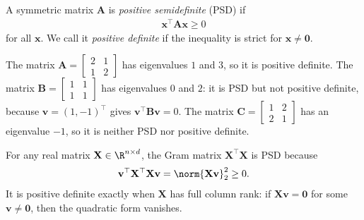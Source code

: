 \documentclass[a4paper, 12pt]{book}
\begin{document}
\begin{definition}
    A symmetric matrix $\mathbf{A}$ is \emph{positive semidefinite} (PSD) if
    \begin{align}
        \mathbf{x}^\top \mathbf{A}\mathbf{x} \geq 0
    \end{align}
    for all $\mathbf{x}$. We call it \emph{positive definite} if the inequality is strict for $\mathbf{x} \neq \mathbf{0}$.
\end{definition}

\begin{example}
    The matrix
    $\mathbf{A} = \begin{bmatrix}2&1\\1&2\end{bmatrix}$
    has eigenvalues $1$ and $3$, so it is positive definite. The matrix
    $\mathbf{B} = \begin{bmatrix}1&1\\1&1\end{bmatrix}$
    has eigenvalues $0$ and $2$: it is PSD but not positive definite, because
    $\mathbf{v}=(1,-1)^\top$ gives $\mathbf{v}^\top\mathbf{B}\mathbf{v}=0$. The matrix
    $\mathbf{C} = \begin{bmatrix}1&2\\2&1\end{bmatrix}$ has an eigenvalue $-1$, so it
    is neither PSD nor positive definite.
\end{example}

\begin{example}
    For any real matrix $\mathbf{X} \in \R^{n \times d}$, the Gram matrix
    $\mathbf{X}^\top\mathbf{X}$ is PSD because
    \begin{align}
        \mathbf{v}^\top \mathbf{X}^\top\mathbf{X}\mathbf{v}
        = \norm{\mathbf{X}\mathbf{v}}_2^2 \geq 0.
    \end{align}
    It is positive definite exactly when $\mathbf{X}$ has full column rank: if
    $\mathbf{X}\mathbf{v}=\mathbf{0}$ for some $\mathbf{v}\neq\mathbf{0}$, then the
    quadratic form vanishes.
\end{example}
\end{document}
